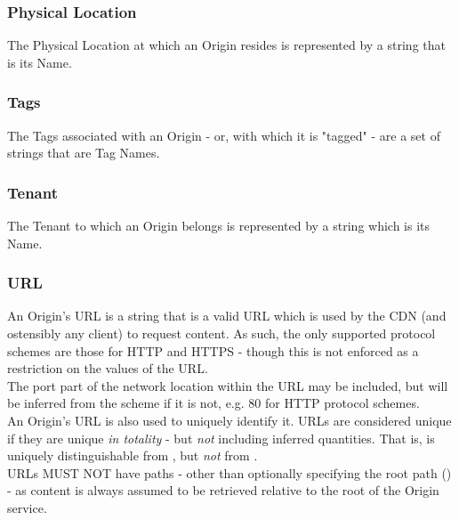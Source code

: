 \subsubsection{Physical Location}
The Physical Location at which an Origin resides is represented by a string that
is its Name.

\subsubsection{Tags}
The Tags associated with an Origin - or, with which it is "tagged" - are a set
of strings that are Tag Names.

\subsubsection{Tenant}
The Tenant to which an Origin belongs is represented by a string which is its
Name.

\subsubsection{URL}
An Origin's URL is a string that is a valid URL which is used by the CDN (and
ostensibly any client) to request content. As such, the only supported protocol
schemes are those for HTTP and HTTPS - though this is not enforced as a
restriction on the values of the URL.\\
The port part of the network location within the URL may be included, but will
be inferred from the scheme if it is not, e.g. 80 for HTTP protocol schemes.\\
An Origin's URL is also used to uniquely identify it. URLs are considered unique
if they are unique \emph{in totality} - but \emph{not} including inferred
quantities. That is,  is uniquely distinguishable from
, but \emph{not} from .\\
URLs MUST NOT have paths - other than optionally specifying the root path
(\code{/}) - as content is always assumed to be retrieved relative to the root
of the Origin service.

